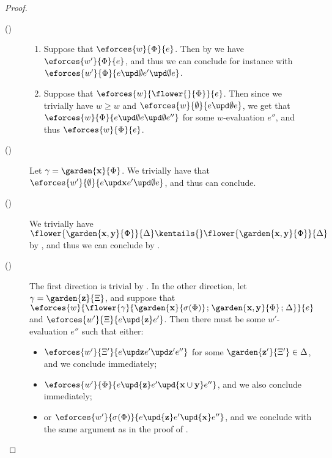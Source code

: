 \begin{scope}
\begin{proof}
\begin{description}
    \item[()]\sbr
    \begin{enumerate}
      \item Suppose that $\eforces{w}{\Phi}{e}$. Then by 
      we have $\eforces{w'}{\Phi}{e}$, and thus we can conclude for instance with
    $\eforces{w'}{\Phi}{\update{e}{\emptyset}{\update{e'}{\emptyset}{e}}}$.
      \item Suppose that $\eforces{w}{\flower{{}}{\Phi}}{e}$. Then since we
      trivially have $w \geq w$ and
      $\eforces{w}{\emptyset}{\update{e}{\emptyset}{e}}$, we get that
      $\eforces{w}{\Phi}{\update{e}{\emptyset}{\update{e}{\emptyset}{e''}}}$
      for some $w$-evaluation $e''$, and thus $\eforces{w}{\Phi}{e}$.
    \end{enumerate}

    \item[()]
      Let $\gamma = \garden{\bx}{\Phi}$. We trivially have that
      $\eforces{w'}{\emptyset}{\update{e}{\bx}{\update{e'}{\emptyset}{e}}}$,
      and thus can conclude.

    \item[()] We trivially have $\flower{\garden{\bx,\by}{\Phi}}{\Delta}
      \kentails{}\flower{\garden{\bx,\by}{\Phi}}{\Delta}$ by
      , and thus we can conclude by
      .

    \item[()] The first direction is trivial by
      . In the other direction, let $\gamma =
      \garden{\bz}{\Xi}$, and suppose that
      $\eforces{w}{\flower{\gamma}{\garden{\bx}{\sigma(\Phi)} \sep
      \garden{\bx,\by}{\Phi} \sep \Delta}}{e}$ and $\eforces{w'}{\Xi}{e
      \upd{\bz} e'}$. Then there must be some $w'$-evaluation $e''$ such that
      either:
      \begin{itemize}
        \item $\eforces{w'}{\Xi'}{\update{e}{\bz}{\update{e'}{\bz'}{e''}}}$ for
        some $\garden{\bz'}{\Xi'} \in \Delta$, and we conclude immediately;
        \item $\eforces{w'}{\Phi}{e \upd{\bz} e' \upd{\bx \cup \by} e''}$, and
        we also conclude immediately;
        \item or $\eforces{w'}{\sigma(\Phi)}{e \upd{\bz} e' \upd{\bx} e''}$, and
        we conclude with the same argument as in the proof of
        .
      \end{itemize}
      

\end{description}
\end{proof}
\end{scope}
